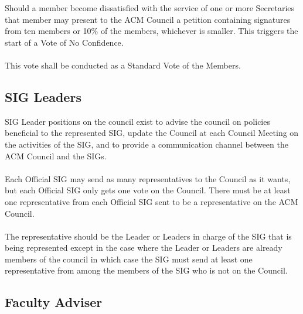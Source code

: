 \documentclass[12pt,titlepage]{article}
\begin{document}
Should a member become dissatisfied with the service of one or more Secretaries that member may present to the ACM Council a petition containing signatures from ten members or 10\% of the members, whichever is smaller. This triggers the start of a Vote of No Confidence.\\
\\
This vote shall be conducted as a Standard Vote of the Members.

\subsection{SIG Leaders}

SIG Leader positions on the council exist to advise the council on policies beneficial to the represented SIG, update the Council at each Council Meeting on the activities of the SIG, and to provide a communication channel between the ACM Council and the SIGs.\\
\\
Each Official SIG may send as many representatives to the Council as it wants, but each Official SIG only gets one vote on the Council. There must be at least one representative from each Official SIG sent to be a representative on the ACM Council.\\
\\
The representative should be the Leader or Leaders in charge of the SIG that is being represented except in the case where the Leader or Leaders are already members of the council in which case the SIG must send at least one representative from among the members of the SIG who is not on the Council.

\subsection{Faculty Adviser}
\end{document}
